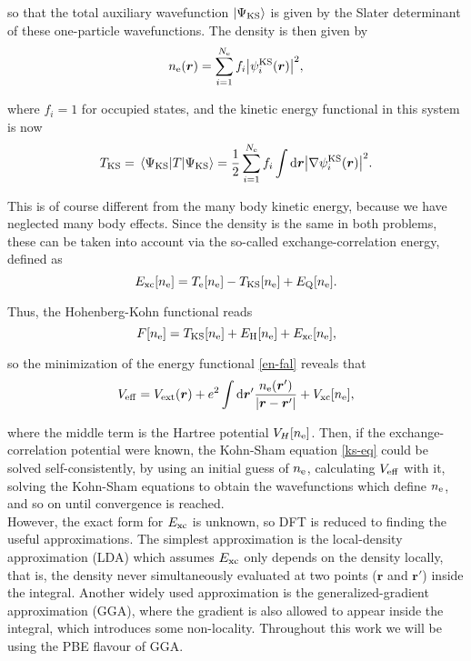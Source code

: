 so that the total auxiliary wavefunction \(\ket{\Psi_{\mathrm{KS}}}\) is given by the Slater determinant of these one-particle wavefunctions. The density is then given by
\begin{equation}
	n_{\mathrm{e}}(\bm r)=\sum^{N_{\mathrm e}}_{i=1}f_i\abs{\psi_i^{\mathrm{KS}}(\bm r)}^2,
\end{equation}

where \(f_i=1\) for occupied states, and the kinetic energy functional in this system is now
\begin{equation}
T_{\mathrm{KS}}=\expval{T}{\Psi_{\mathrm{KS}}}=\frac1 2\sum_{i=1}^{N_{\mathrm e}}f_i\int\mathrm{d}\bm r\abs{\nabla\psi_i^{\mathrm{KS}}(\bm r)}^2.
\end{equation}

This is of course different from the many body kinetic energy, because we have neglected many body effects. Since the density is the same in both problems, these can be taken into account via the so-called exchange-correlation energy, defined as
\begin{equation}
E_{\mathrm{xc}}[n_{\mathrm{e}}]=T_{\mathrm{e}}[n_{\mathrm{e}}]-T_{\mathrm{KS}}[n_{\mathrm{e}}]+E_{\mathrm{Q}}[n_{\mathrm{e}}].
\end{equation}

Thus, the Hohenberg-Kohn functional reads
\begin{equation}
F[n_{\mathrm{e}}]=T_{\mathrm{KS}}[n_{\mathrm{e}}]+E_{\mathrm{H}}[n_{\mathrm{e}}]+E_{\mathrm{xc}}[n_{\mathrm{e}}],
\end{equation}

so the minimization of the energy functional \ref{en-fal} reveals that\parencite{Martin2004}
\begin{equation}
\label{veff}
V_{\mathrm{eff}}=V_{\mathrm{ext}}(\bm r)+e^2\int\mathrm{d}\bm r'\frac{n_{\mathrm{e}}(\bm r')}{\abs{\bm r-\bm r'}}+V_{\mathrm{xc}}[n_{\mathrm{e}}],
\end{equation}

where the middle term is the Hartree potential \(V_{H}[n_{\mathrm{e}}]\). Then, if the exchange-correlation potential were known, the Kohn-Sham equation \ref{ks-eq} could be solved self-consistently, by using an initial guess of \(n_{\mathrm{e}}\), calculating \(V_{\mathrm{eff}}\) with it, solving the Kohn-Sham equations to obtain the wavefunctions which define \(n_{\mathrm{e}}\), and so on until convergence is reached.\\

However, the exact form for \(E_{\mathrm{xc}}\) is unknown\parencite{Martin2004}, so DFT is reduced to finding the useful approximations. The simplest approximation is the local-density approximation (LDA)\parencite{Kohn1965} which assumes \(E_{\mathrm{xc}}\) only depends on the density locally, that is, the density never simultaneously evaluated at two points (\(\bm r\) and \(\bm r'\)) inside the integral. Another widely used approximation is the generalized-gradient approximation (GGA)\parencite{Martin2004}, where the gradient is also allowed to appear inside the integral, which introduces some non-locality. Throughout this work we will be using the PBE\parencite{Perdew1996,Perdew1996a} flavour of GGA.

